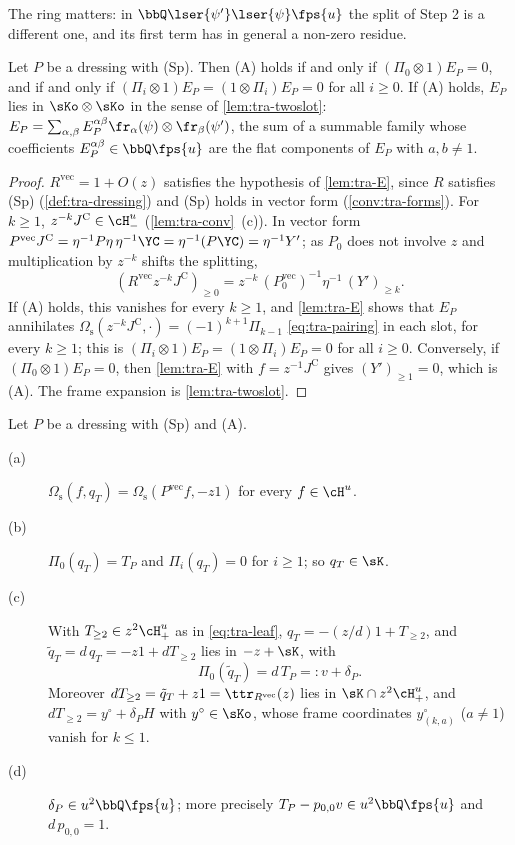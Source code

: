The ring matters: in $\bbQ\lser{\psi'}\lser{\psi}\fps{u}$ the split of Step 2 is a different one, and its first term has in general a non-zero residue.

\begin{cor}
\label{cor:tra-edges}
Let $P$ be a dressing with (Sp). Then (A) holds if and only if $(\Pi_0\otimes 1)E_P = 0$, and if and only if $(\Pi_i\otimes 1)E_P = (1\otimes\Pi_i)E_P = 0$ for all $i\geq 0$. If (A) holds, $E_P$ lies in $\sKo\otimes\sKo$ in the sense of \cref{lem:tra-twoslot}: $E_P = \sum_{\alpha,\beta}E_P^{\alpha\beta}\fr_\alpha(\psi)\otimes\fr_\beta(\psi')$, the sum of a summable family whose coefficients $E_P^{\alpha\beta}\in\bbQ\fps{u}$ are the flat components of $E_P$ with $a,b\neq 1$.
\end{cor}

\begin{proof}
$R^{\mathrm{vec}} = 1+O(z)$ satisfies the hypothesis of \cref{lem:tra-E}, since $R$ satisfies (Sp) (\cref{def:tra-dressing}) and (Sp) holds in vector form (\cref{conv:tra-forms}). For $k\geq 1$, $z^{-k}J^{\mathrm C}\in\cH^u_-$ (\cref{lem:tra-conv}~(c)). In vector form $P^{\mathrm{vec}}J^{\mathrm C} = \eta^{-1}P\eta\,\eta^{-1}\YC = \eta^{-1}(P\YC) = \eta^{-1}Y'$; as $P_0$ does not involve $z$ and multiplication by $z^{-k}$ shifts the splitting,
\[
(R^{\mathrm{vec}}z^{-k}J^{\mathrm C})_{\geq 0} = z^{-k}\,(P_0^{\mathrm{vec}})^{-1}\eta^{-1}\,(Y')_{\geq k} .
\]
If (A) holds, this vanishes for every $k\geq 1$, and \cref{lem:tra-E} shows that $E_P$ annihilates $\Omega_{\mathrm s}(z^{-k}J^{\mathrm C},\cdot) = (-1)^{k+1}\Pi_{k-1}$ \eqref{eq:tra-pairing} in each slot, for every $k\geq 1$; this is $(\Pi_i\otimes 1)E_P = (1\otimes\Pi_i)E_P = 0$ for all $i\geq 0$. Conversely, if $(\Pi_0\otimes 1)E_P = 0$, then \cref{lem:tra-E} with $f = z^{-1}J^{\mathrm C}$ gives $(Y')_{\geq 1} = 0$, which is (A). The frame expansion is \cref{lem:tra-twoslot}.
\end{proof}

\begin{lem}
\label{lem:tra-T}
Let $P$ be a dressing with (Sp) and (A).
\begin{description}
\item[(a)] $\Omega_{\mathrm s}(f,q_T) = \Omega_{\mathrm s}(P^{\mathrm{vec}}f,-z1)$ for every $f\in\cH^u$.
\item[(b)] $\Pi_0(q_T) = T_P$ and $\Pi_i(q_T) = 0$ for $i\geq 1$; so $q_T\in\sK$.
\item[(c)] With $T_{\geq 2}\in z^2\cH^u_+$ as in \eqref{eq:tra-leaf}, $q_T = -(z/d)1+T_{\geq 2}$, and $\tilde q_T = d\,q_T = -z1+dT_{\geq 2}$ lies in $-z+\sK$, with
\[
\Pi_0(\tilde q_T) = d\,T_P =: v+\delta_P .
\]
Moreover $dT_{\geq 2} = \tilde q_T+z1 = \ttr_{R^{\mathrm{vec}}}(z)$ lies in $\sK\cap z^2\cH^u_+$, and $dT_{\geq 2} = y^\circ+\delta_PH$ with $y^\circ\in\sKo$, whose frame coordinates $y^\circ_{(k,a)}$ ($a\neq 1$) vanish for $k\leq 1$.
\item[(d)] $\delta_P\in u^2\bbQ\fps{u}$; more precisely $T_P-p_{0,0}v\in u^2\bbQ\fps{u}$ and $d\,p_{0,0} = 1$.
\end{description}
\end{lem}


